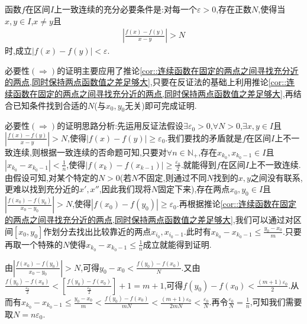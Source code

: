 \documentclass[lang=cn,newtx,10pt,scheme=chinese]{../Template/elegantbook}
\begin{document}
\begin{proposition}[一致连续的充要条件]\label{pro:一致连续的充要条件1}
    函数\(f\)在区间\(I\)上一致连续的充分必要条件是:对每一个\(\varepsilon > 0\),存在正数\(N\),使得当\(x,y\in I\),\(x\neq y\)且
\begin{align*}
    \left|\frac{f(x) - f(y)}{x - y}\right| > N
\end{align*}
时,成立\(|f(x) - f(y)|<\varepsilon\).
\end{proposition}
\begin{note}
    必要性$(\Rightarrow)$的证明主要应用了推论\ref{cor::连续函数在固定的两点之间寻找充分近的两点,同时保持两点函数值之差足够大},只要在反证法的基础上利用推论\ref{cor::连续函数在固定的两点之间寻找充分近的两点,同时保持两点函数值之差足够大},再结合已知条件找到合适的$N$(与$x_0,y_0$无关)即可完成证明.

    {\color{blue}必要性$(\Rightarrow)$的证明思路分析:}先运用反证法假设\(\exists \varepsilon _0>0\),\(\forall N>0\),\(\exists x,y\in I\)且\(\left| \frac{f\left( x \right) -f\left( y \right)}{x-y} \right|>N\),使得\(\left| f\left( x \right) -f\left( y \right) \right|\geqslant  \varepsilon _0\).我们要找的矛盾就是$f$在区间$I$上不一致连续,则根据一致连续的否命题可知,只要对\(\forall n\in \mathbb{N} _+\),存在\(x_{k_0},x_{k_0 - 1}\in I\)且\(\left| x_{k_0}-x_{k_0 - 1} \right|<\frac{1}{n}\),使得\(\left| f\left( x_k \right) -f\left( x_{k - 1} \right) \right|\geqslant  \frac{\varepsilon _0}{2}\).就能得到$f$在区间$I$上不一致连续.由假设可知,对某个特定的$N>0$(若$N$不固定,则通过不同$N$找到的$x,y$之间没有联系,更难以找到充分近的$x',x''$,因此我们现将$N$固定下来),存在两点$x_0,y_0\in I$且\(\left| \frac{f\left( x_0 \right) -f\left( y_0 \right)}{x_0-y_0} \right|>N\),使得\(\left| f\left( x_0 \right) -f\left( y_0 \right) \right|\geqslant  \varepsilon _0\).再根据推论\ref{cor::连续函数在固定的两点之间寻找充分近的两点,同时保持两点函数值之差足够大},我们可以通过对区间$[x_0,y_0]$作划分去找出比较靠近的两点$x_{i_0},x_{i_0-1}$.此时有$x_{k_0}-x_{k_0-1}\leqslant \frac{y_0-x_0}{m}$.只要再取一个特殊的$N$使得$x_{k_0}-x_{k_0-1}\leqslant \frac{1}{n}$成立就能得到证明.
    
    由$\left| \frac{f\left( x_0 \right) -f\left( y_0 \right)}{x_0-y_0} \right|>N
    $,可得$y_0-x_0<\frac{f\left( y_0 \right) -f\left( x_0 \right)}{N}$.又由$\frac{f\left( y_0 \right) -f\left( x_0 \right)}{\frac{\varepsilon _0}{2}}<\left[ \frac{f\left( y_0 \right) -f\left( x_0 \right)}{\frac{\varepsilon _0}{2}} \right] +1=m+1$,可得$f\left( y_0 \right) -f\left( x_0 \right) <\frac{\left( m+1 \right) \varepsilon _0}{2}$.从而有$x_{k_0}-x_{k_0-1}\leqslant \frac{y_0-x_0}{m}<\frac{f\left( y_0 \right) -f\left( x_0 \right)}{mN}<\frac{\left( m+1 \right) \varepsilon _0}{2mN}<\frac{\varepsilon _0}{N}$.再令$\frac{\varepsilon _0}{N}=\frac{1}{n}$,可知我们需要取$N=n\varepsilon _0$.
\end{note}
\end{document}
